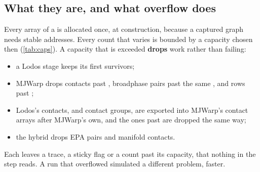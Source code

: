 \subsection{What they are, and what overflow does}\label{sec:capwhat}

Every array of a  is allocated once, at construction, because a captured graph needs stable addresses. Every count that varies is bounded by a capacity chosen then (\cref{tab:caps}). A capacity that is exceeded \textbf{drops} work rather than failing:

\begin{itemize}
\item a Lodos stage keeps its first survivors;
\item MJWarp drops contacts past , broadphase pairs past the same , and rows past ;
\item Lodos's contacts, and contact groups, are exported into MJWarp's contact arrays after MJWarp's own, and the ones past  are dropped the same way;
\item the hybrid drops EPA pairs and manifold contacts.
\end{itemize}

Each leaves a trace, a sticky flag or a count past its capacity, that nothing in the step reads. A run that overflowed simulated a different problem, faster.

